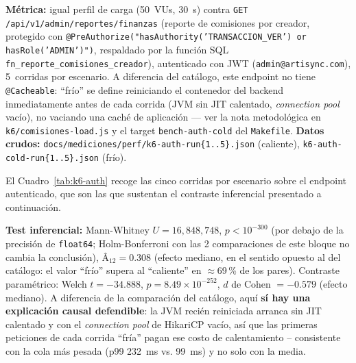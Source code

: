 \textbf{Métrica:} igual perfil de carga (50~VUs, 30~s) contra
\texttt{GET /api/v1/admin/reportes/finanzas} (reporte de comisiones por
creador, protegido con \texttt{@PreAuthorize("hasAuthority('TRANSACCION\_VER')
or hasRole('ADMIN')")}, respaldado por la función SQL
\texttt{fn\_reporte\_comisiones\_creador}), autenticado con JWT
(\texttt{admin@artisync.com}), 5~corridas por escenario. A diferencia del
catálogo, este endpoint no tiene \texttt{@Cacheable}: ``frío'' se define
reiniciando el contenedor del backend inmediatamente antes de cada
corrida (JVM sin JIT calentado, \emph{connection pool} vacío), no
vaciando una caché de aplicación --- ver la nota metodológica en
\texttt{k6/comisiones-load.js} y el target \texttt{bench-auth-cold} del
\texttt{Makefile}. \textbf{Datos crudos:}
\texttt{docs/mediciones/perf/k6-auth-run\{1..5\}.json} (caliente),
\texttt{k6-auth-cold-run\{1..5\}.json} (frío).

El Cuadro~\ref{tab:k6-auth} recoge las cinco corridas por escenario sobre
el endpoint autenticado, que son las que sustentan el contraste
inferencial presentado a continuación.

\begin{table}[H]
\centering
\caption{Resultados de la prueba de carga k6 sobre el endpoint protegido}
\label{tab:k6-auth}
\end{table}

\textbf{Test inferencial:} Mann-Whitney $U=16{,}848{,}748$,
$p<10^{-300}$ (por debajo de la precisión de \texttt{float64}; Holm-Bonferroni
con las 2 comparaciones de este bloque no cambia la conclusión),
Â$_{12}=0.308$ (efecto mediano, en el sentido opuesto al del catálogo: el
valor ``frío'' supera al ``caliente'' en $\approx$69\,\% de los pares).
Contraste paramétrico: Welch $t=-34.888$, $p=8.49\times10^{-252}$, $d$ de
Cohen $=-0.579$ (efecto mediano). A diferencia de la comparación del
catálogo, aquí \textbf{sí hay una explicación causal defendible}: la JVM
recién reiniciada arranca sin JIT calentado y con el \emph{connection
pool} de HikariCP vacío, así que las primeras peticiones de cada corrida
``fría'' pagan ese costo de calentamiento -- consistente con la cola más
pesada (p99 232~ms vs. 99~ms) y no solo con la media.

